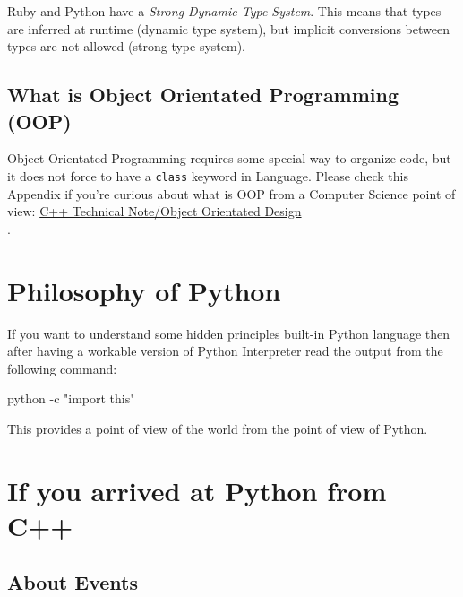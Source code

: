 \documentclass[
]{article}
\newenvironment{Shaded}{}{}
\newcommand{\AttributeTok}[1]{\textcolor[rgb]{0.49,0.56,0.16}{#1}}
\newcommand{\ExtensionTok}[1]{#1}
\newcommand{\StringTok}[1]{\textcolor[rgb]{0.25,0.44,0.63}{#1}}
\begin{document}
Ruby and Python have a \emph{Strong Dynamic Type System}. This means
that types are inferred at runtime (dynamic type system), but implicit
conversions between types are not allowed (strong type system).

\hypertarget{what-is-object-orientated-programming-oop}{%
\subsection{What is Object Orientated Programming
(OOP)}\label{what-is-object-orientated-programming-oop}}

Object-Orientated-Programming requires some special way to organize
code, but it does not force to have a \texttt{class} keyword in
Language. Please check this Appendix if you're curious about what is OOP
from a Computer Science point of view:
\href{https://github.com/burlachenkok/CPP_from_1998_to_2020/blob/main/Cpp-Technical-Note.md\#object-orientated-design}{C++
Technical Note/Object Orientated Design\\
}.

\hypertarget{philosophy-of-python}{%
\section{Philosophy of Python}\label{philosophy-of-python}}

If you want to understand some hidden principles built-in Python
language then after having a workable version of Python Interpreter read
the output from the following command:

\begin{Shaded}
\begin{Highlighting}[]
\ExtensionTok{python} \AttributeTok{{-}c} \StringTok{"import this"}
\end{Highlighting}
\end{Shaded}

This provides a point of view of the world from the point of view of
Python.

\hypertarget{if-you-arrived-at-python-from-c}{%
\section{If you arrived at Python from
C++}\label{if-you-arrived-at-python-from-c}}

\hypertarget{about-events}{%
\subsection{About Events}\label{about-events}}
\end{document}

